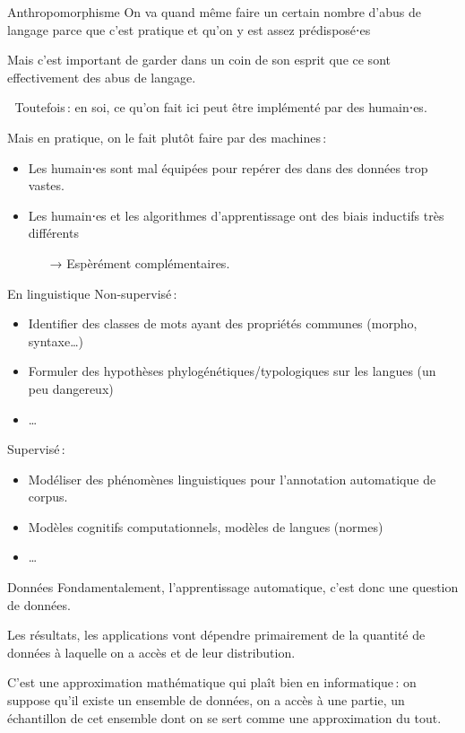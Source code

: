 \documentclass[
	xcolor={svgnames},
	aspectratio=169,
	french,
]{beamer}
\begin{document}
\begin{frame}{Anthropomorphisme}
	On va quand même faire un certain nombre d'\alert{abus de langage} parce que c'est pratique et qu'on y est assez prédisposé⋅es

	\pause

	Mais c'est important de garder dans un coin de son esprit que ce sont effectivement des abus de langage.
\end{frame}
\begin{frame}{🐙}
	Toutefois : en soi, ce qu'on fait ici peut être implémenté par des humain⋅es.

	\pause

	Mais en pratique, on le fait plutôt faire par des \alert{machines} :

	\begin{itemize}[<+->]
		\item Les humain⋅es sont mal équipées pour repérer des  dans des \alert{données trop vastes}.
		\item Les humain⋅es et les algorithmes d'apprentissage ont des \alert{biais} inductifs très différents
			\begin{itemize}
				\item[→] Espèrément complémentaires.
			\end{itemize}
	\end{itemize}
\end{frame}

\begin{frame}{En linguistique}
	Non-supervisé :
	\begin{itemize}
		\item \alert{Identifier} des classes de mots ayant des propriétés communes (morpho, syntaxe…)
		\item Formuler des \alert{hypothèses phylogénétiques/typologiques} sur les langues (un peu dangereux)
		\item …
	\end{itemize}
	Supervisé :
	\begin{itemize}
		\item Modéliser des phénomènes linguistiques pour l'\alert{annotation} automatique de corpus.
		\item \alert{Modèles cognitifs} computationnels, modèles de langues (normes)
		\item …
	\end{itemize}
\end{frame}

\begin{frame}{Données}
	Fondamentalement, l'apprentissage automatique, c'est donc une question de \alert{données}.

	\pause

	Les résultats, les applications vont dépendre primairement de la \alert{quantité} de données à laquelle on a accès et de leur \alert{distribution}.

	\pause

	C'est une approximation mathématique qui plaît bien en informatique : on suppose qu'il existe un ensemble de données, on a accès à une partie, un \alert{échantillon} de cet ensemble dont on se sert comme une \alert{approximation} du tout.
\end{frame}
\end{document}
